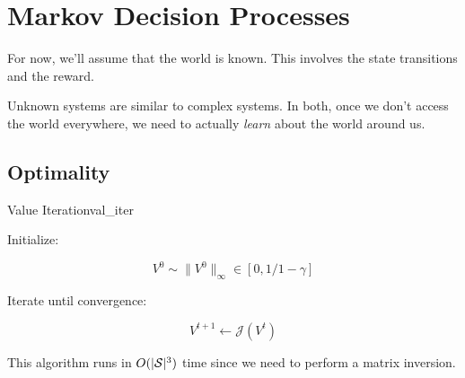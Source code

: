 \documentclass[../main/main]{subfiles}
\begin{document}
    
\chapter{Markov Decision Processes}


For now, we'll assume that the world is known. This involves the state transitions and the reward.


Unknown systems are similar to complex systems. In both, once we don't access the world everywhere, we need to actually \emph{learn} about the world around us.



\section{Optimality}


\begin{theorem}{Value Iteration}{val_iter}

Initialize:

\[
    V^0 \sim \|V^0\|_\infty \in [0, 1/1-\gamma]
\]

Iterate until convergence:

\[
    V^{t+1} \gets \mathcal{J}(V^t)
\]


This algorithm runs in $O(|\mathcal{S}|^3)$ time since we need to perform a matrix
inversion.

\end{theorem}
\end{document}
